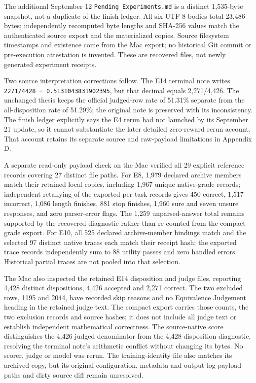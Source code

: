 \documentclass[12pt,a4paper]{report}
\begin{document}
The additional September 12 \texttt{Pending\_Experiments.md} is a
distinct 1,535-byte snapshot, not a duplicate of the finish ledger. All
six UTF-8 bodies total 23,486 bytes; independently recomputed byte
lengths and SHA-256 values match the authenticated source export and the
materialized copies. Source filesystem timestamps and existence come
from the Mac export; no historical Git commit or pre-execution
attestation is invented. These are recovered files, not newly generated
experiment receipts.

Two source interpretation corrections follow. The E14 terminal note
writes \texttt{2271/4428\ =\ 0.5131043831902395}, but that decimal
equals 2,271/4,426. The unchanged thesis keeps the official judged-row
rate of 51.31\% separate from the all-disposition rate of 51.29\%; the
original note is preserved with its inconsistency. The finish ledger
explicitly says the E4 rerun had not launched by its September 21
update, so it cannot substantiate the later detailed zero-reward rerun
account. That account retains its separate source and raw-payload
limitations in Appendix D.

A separate read-only payload check on the Mac verified all 29 explicit
reference records covering 27 distinct file paths. For E8, 1,979
declared archive members match their retained local copies, including
1,967 unique native-grade records; independent retallying of the
exported per-task records gives 450 correct, 1,517 incorrect, 1,086
length finishes, 881 stop finishes, 1,960 sure and seven unsure
responses, and zero parser-error flags. The 1,259 unparsed-answer total
remains supported by the recovered diagnostic rather than re-counted
from the compact grade export. For E10, all 525 declared archive-member
bindings match and the selected 97 distinct native traces each match
their receipt hash; the exported trace records independently sum to 88
utility passes and zero handled errors. Historical partial traces are
not pooled into that selection.

The Mac also inspected the retained E14 disposition and judge files,
reporting 4,428 distinct dispositions, 4,426 accepted and 2,271 correct.
The two excluded rows, 1195 and 2044, have recorded skip reasons and no
Equivalence Judgement heading in the retained judge text. The compact
export carries those counts, the two exclusion records and source
hashes; it does not include all judge text or establish independent
mathematical correctness. The source-native score distinguishes the
4,426 judged denominator from the 4,428-disposition diagnostic,
resolving the terminal note's arithmetic conflict without changing its
bytes. No scorer, judge or model was rerun. The training-identity file
also matches its archived copy, but its original configuration, metadata
and output-log payload paths and dirty source diff remain unresolved.
\end{document}
